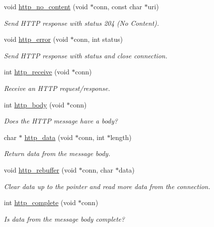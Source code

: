 \begin{DoxyCompactItemize}
void \hyperlink{group__http__connection_ga48e49b5c445099537f9b9b4ae89fa8df}{http\+\_\+no\+\_\+content} (void $\ast$conn, const char $\ast$uri)
\begin{DoxyCompactList}\small\item\em Send H\+T\+TP response with status 204 (No Content). \end{DoxyCompactList}\item 
void \hyperlink{group__http__connection_gac4613339c6810e44f79f8c4942ae9f6c}{http\+\_\+error} (void $\ast$conn, int status)
\begin{DoxyCompactList}\small\item\em Send H\+T\+TP response with status and close connection. \end{DoxyCompactList}\item 
int \hyperlink{group__http__connection_ga8573192ee45dd0e3a5111bab62e03e44}{http\+\_\+receive} (void $\ast$conn)
\begin{DoxyCompactList}\small\item\em Receive an H\+T\+TP request/response. \end{DoxyCompactList}\item 
int \hyperlink{group__http__connection_ga92f8776c838fb93b9ea9aedfc665a694}{http\+\_\+body} (void $\ast$conn)
\begin{DoxyCompactList}\small\item\em Does the H\+T\+TP message have a body? \end{DoxyCompactList}\item 
char $\ast$ \hyperlink{group__http__connection_gaa572f95189ccc118a8fc1d070b76f896}{http\+\_\+data} (void $\ast$conn, int $\ast$length)
\begin{DoxyCompactList}\small\item\em Return data from the message body. \end{DoxyCompactList}\item 
void \hyperlink{group__http__connection_ga5150a5e062ed872568f6666ce8859baa}{http\+\_\+rebuffer} (void $\ast$conn, char $\ast$data)
\begin{DoxyCompactList}\small\item\em Clear data up to the pointer and read more data from the connection. \end{DoxyCompactList}\item 
int \hyperlink{group__http__connection_ga840e20735c835fbd29956a2d82b5ef71}{http\+\_\+complete} (void $\ast$conn)
\begin{DoxyCompactList}\small\item\em Is data from the message body complete? \end{DoxyCompactList}\item 

\end{DoxyCompactItemize}
